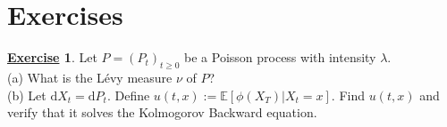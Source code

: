 \documentclass[12pt]{book}
\let\varphi\phi
\numberwithin{equation}{chapter}
\theoremstyle{plain}
\numberwithin{theorem}{section}
\theoremstyle{definition}
\newtheorem{exercise}{\underline{Exercise}}
\numberwithin{exercise}{chapter}
\let\oldendproof\endproof
\renewenvironment{proof}[1][\proofname]{%
  \oldproof[\scshape\underline{#1}]%
}{\oldendproof}
\newcommand{\<}{\langle}
\renewcommand{\>}{\rangle}
\renewcommand{\(}{\left(}
\renewcommand{\)}{\right)}
\renewcommand{\[}{\left[}
\renewcommand{\]}{\right]}
\newcommand\Eb{\mathds{E}}
\newcommand\lam{\lambda}
\newcommand\dd{\mathrm{d}}
\newcommand\ee{\mathrm{e}}
\begin{document}


\section{Exercises}
\label{sec:exercises-10}

\begin{exercise}
\label{exer:10.1}
Let $P=(P_t)_{t \geq 0}$ be a Poisson process with intensity $\lam$.\\
(a) What is the L\'evy measure $\nu$ of $P$?\\
(b) Let $\dd X_t = \dd P_t$.  Define $u(t,x) := \Eb[ \varphi(X_T) | X_t = x ]$.
Find $u(t,x)$ and verify that it solves the Kolmogorov Backward equation.
\end{exercise}
\end{document}
